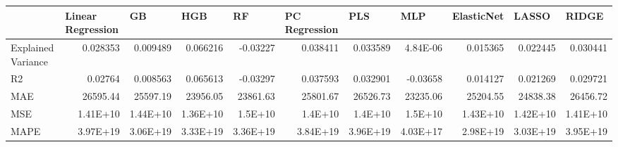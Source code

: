 \begin{tabular}{lrrrrrrrrrr}
\toprule
      & \multicolumn{1}{l}{Linear Regression} & \multicolumn{1}{l}{GB} & \multicolumn{1}{l}{HGB} & \multicolumn{1}{l}{RF} & \multicolumn{1}{l}{PC Regression} & \multicolumn{1}{l}{PLS} & \multicolumn{1}{l}{MLP} & \multicolumn{1}{l}{ElasticNet} & \multicolumn{1}{l}{LASSO} & \multicolumn{1}{l}{RIDGE} \\
\midrule
\midrule
Explained Variance & \cellcolor[rgb]{ .945,  .957,  .984}0.028353 & \cellcolor[rgb]{ .98,  .827,  .839}0.009489 & \cellcolor[rgb]{ .353,  .541,  .776}0.066216 & \cellcolor[rgb]{ .973,  .412,  .42}-0.03227 & \cellcolor[rgb]{ .788,  .847,  .929}0.038411 & \cellcolor[rgb]{ .863,  .902,  .957}0.033589 & \cellcolor[rgb]{ .98,  .733,  .741}4.84E-06 & \cellcolor[rgb]{ .984,  .886,  .898}0.015365 & \cellcolor[rgb]{ .984,  .957,  .969}0.022445 & \cellcolor[rgb]{ .91,  .933,  .973}0.030441 \\
R2    & \cellcolor[rgb]{ .941,  .957,  .984}0.02764 & \cellcolor[rgb]{ .98,  .835,  .847}0.008563 & \cellcolor[rgb]{ .353,  .541,  .776}0.065613 & \cellcolor[rgb]{ .973,  .443,  .451}-0.03297 & \cellcolor[rgb]{ .788,  .847,  .929}0.037593 & \cellcolor[rgb]{ .859,  .898,  .957}0.032901 & \cellcolor[rgb]{ .973,  .412,  .42}-0.03658 & \cellcolor[rgb]{ .984,  .89,  .898}0.014127 & \cellcolor[rgb]{ .984,  .957,  .969}0.021269 & \cellcolor[rgb]{ .91,  .933,  .973}0.029721 \\
MAE   & \cellcolor[rgb]{ .973,  .412,  .42}26595.44 & \cellcolor[rgb]{ .988,  .894,  .906}25597.19 & \cellcolor[rgb]{ .561,  .686,  .847}23956.05 & \cellcolor[rgb]{ .533,  .667,  .839}23861.63 & \cellcolor[rgb]{ .984,  .796,  .808}25801.67 & \cellcolor[rgb]{ .976,  .447,  .455}26526.73 & \cellcolor[rgb]{ .353,  .541,  .776}23235.06 & \cellcolor[rgb]{ .929,  .945,  .976}25204.55 & \cellcolor[rgb]{ .82,  .871,  .941}24838.38 & \cellcolor[rgb]{ .976,  .482,  .49}26456.72 \\
MSE   & \cellcolor[rgb]{ .937,  .953,  .98}1.41E+10 & \cellcolor[rgb]{ .984,  .839,  .851}1.44E+10 & \cellcolor[rgb]{ .353,  .541,  .776}1.36E+10 & \cellcolor[rgb]{ .976,  .447,  .455}1.5E+10 & \cellcolor[rgb]{ .784,  .843,  .925}1.4E+10 & \cellcolor[rgb]{ .855,  .894,  .953}1.4E+10 & \cellcolor[rgb]{ .973,  .412,  .42}1.5E+10 & \cellcolor[rgb]{ .988,  .894,  .902}1.43E+10 & \cellcolor[rgb]{ .988,  .961,  .973}1.42E+10 & \cellcolor[rgb]{ .906,  .929,  .969}1.41E+10 \\
MAPE  & \cellcolor[rgb]{ .973,  .412,  .42}3.97E+19 & \cellcolor[rgb]{ .929,  .945,  .976}3.06E+19 & \cellcolor[rgb]{ .984,  .984,  .996}3.33E+19 & \cellcolor[rgb]{ .988,  .98,  .992}3.36E+19 & \cellcolor[rgb]{ .976,  .537,  .545}3.84E+19 & \cellcolor[rgb]{ .976,  .424,  .431}3.96E+19 & \cellcolor[rgb]{ .353,  .541,  .776}4.03E+17 & \cellcolor[rgb]{ .918,  .937,  .973}2.98E+19 & \cellcolor[rgb]{ .925,  .945,  .976}3.03E+19 & \cellcolor[rgb]{ .976,  .435,  .443}3.95E+19 \\
\bottomrule
\bottomrule
\end{tabular}%
